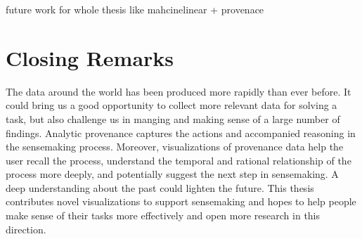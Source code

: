 future work for whole thesis like mahcinelinear + provenace

\section{Closing Remarks}
The data around the world has been produced more rapidly than ever before. It could bring us a good opportunity to collect more relevant data for solving a task, but also challenge us in manging and making sense of a large number of findings. Analytic provenance captures the actions and accompanied reasoning in the sensemaking process. Moreover, visualizations of provenance data help the user recall the process, understand the temporal and rational relationship of the process more deeply, and potentially suggest the next step in sensemaking. A deep understanding about the past could lighten the future. This thesis contributes novel visualizations to support sensemaking and hopes to help people make sense of their tasks more effectively and open more research in this direction.